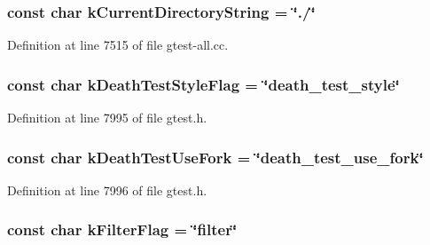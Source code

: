 \hypertarget{namespacetesting_1_1internal_a3a1c5c5e8ecf330ad74a3983ba59f09a}{
\subsubsection[{k\-Current\-Directory\-String}]{\setlength{\rightskip}{0pt plus 5cm}const char {\bf k\-Current\-Directory\-String} = \char`\"{}./\char`\"{}}}\label{d0/da7/namespacetesting_1_1internal_a3a1c5c5e8ecf330ad74a3983ba59f09a}


\-Definition at line 7515 of file gtest-\/all.\-cc.

\hypertarget{namespacetesting_1_1internal_ac0febb92c715571e1de67b6202c9cdf0}{
\subsubsection[{k\-Death\-Test\-Style\-Flag}]{\setlength{\rightskip}{0pt plus 5cm}const char {\bf k\-Death\-Test\-Style\-Flag} = \char`\"{}death\-\_\-test\-\_\-style\char`\"{}}}\label{d0/da7/namespacetesting_1_1internal_ac0febb92c715571e1de67b6202c9cdf0}


\-Definition at line 7995 of file gtest.\-h.

\hypertarget{namespacetesting_1_1internal_a273ce8e6e8fd1876e73ea69c279c9889}{
\subsubsection[{k\-Death\-Test\-Use\-Fork}]{\setlength{\rightskip}{0pt plus 5cm}const char {\bf k\-Death\-Test\-Use\-Fork} = \char`\"{}death\-\_\-test\-\_\-use\-\_\-fork\char`\"{}}}\label{d0/da7/namespacetesting_1_1internal_a273ce8e6e8fd1876e73ea69c279c9889}


\-Definition at line 7996 of file gtest.\-h.

\hypertarget{namespacetesting_1_1internal_ae8ede5b14ce6f96fff7e0aabe86aceef}{
\subsubsection[{k\-Filter\-Flag}]{\setlength{\rightskip}{0pt plus 5cm}const char {\bf k\-Filter\-Flag} = \char`\"{}filter\char`\"{}}}\label{d0/da7/namespacetesting_1_1internal_ae8ede5b14ce6f96fff7e0aabe86aceef}


